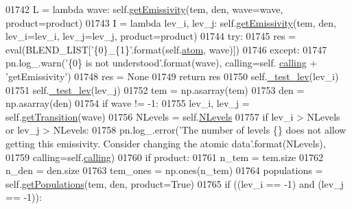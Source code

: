 \begin{DoxyCode}
01742             L = \textcolor{keyword}{lambda} wave: self.\hyperlink{classpyneb_1_1core_1_1pynebcore_1_1_atom_aaf4e84a9d5f835e6284bd9302314f775}{getEmissivity}(tem, den, wave=wave, product=product)
01743             I = \textcolor{keyword}{lambda} lev\_i, lev\_j: self.\hyperlink{classpyneb_1_1core_1_1pynebcore_1_1_atom_aaf4e84a9d5f835e6284bd9302314f775}{getEmissivity}(tem, den, lev\_i=lev\_i, lev\_j=lev\_j, 
      product=product)
01744             \textcolor{keywordflow}{try}:
01745                 res = eval(BLEND\_LIST[\textcolor{stringliteral}{'\{0\}\_\{1\}'}.format(self.\hyperlink{classpyneb_1_1core_1_1pynebcore_1_1_atom_a192f3e20446d7fba81d789bc705d6c71}{atom}, wave)])
01746             \textcolor{keywordflow}{except}:
01747                 pn.log\_.warn(\textcolor{stringliteral}{'\{0\} is not understood'}.format(wave), calling=self.
      \hyperlink{classpyneb_1_1core_1_1pynebcore_1_1_atom_a373b7735acf4f528b54bddf373ad67a1}{calling} + \textcolor{stringliteral}{'getEmissivity'})
01748                 res = \textcolor{keywordtype}{None}
01749             \textcolor{keywordflow}{return} res
01750         self.\hyperlink{classpyneb_1_1core_1_1pynebcore_1_1_atom_ade3de73e8bdb814d01d2d9af98eba87f}{\_test\_lev}(lev\_i)
01751         self.\hyperlink{classpyneb_1_1core_1_1pynebcore_1_1_atom_ade3de73e8bdb814d01d2d9af98eba87f}{\_test\_lev}(lev\_j)
01752         tem = np.asarray(tem)
01753         den = np.asarray(den)
01754         \textcolor{keywordflow}{if} wave != -1:
01755             lev\_i, lev\_j = self.\hyperlink{classpyneb_1_1core_1_1pynebcore_1_1_atom_a7c9f17a3d9e841267add92377d9d1ede}{getTransition}(wave)
01756         NLevels = self.\hyperlink{classpyneb_1_1core_1_1pynebcore_1_1_atom_a6b43c1e6431a6786c1b4267f704fb4e8}{NLevels}
01757         \textcolor{keywordflow}{if} lev\_i > NLevels \textcolor{keywordflow}{or} lev\_j > NLevels:
01758             pn.log\_.error(\textcolor{stringliteral}{'The number of levels \{\} does not allow getting this emissivity. Consider
       changing the atomic data'}.format(NLevels),
01759                           calling=self.\hyperlink{classpyneb_1_1core_1_1pynebcore_1_1_atom_a373b7735acf4f528b54bddf373ad67a1}{calling}) 
01760         \textcolor{keywordflow}{if} product:
01761             n\_tem = tem.size
01762             n\_den = den.size
01763             tem\_ones = np.ones(n\_tem)
01764             populations = self.\hyperlink{classpyneb_1_1core_1_1pynebcore_1_1_atom_aab7496403c8aaef40ab3b20b5c00e9f0}{getPopulations}(tem, den, product=\textcolor{keyword}{True})
01765             \textcolor{keywordflow}{if} ((lev\_i == -1) \textcolor{keywordflow}{and} (lev\_j == -1)):

\end{DoxyCode}
